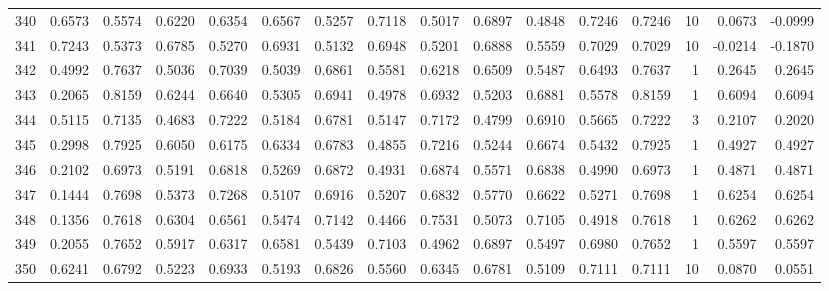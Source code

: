 \begin{tabular}{lrrrrrrrrrrrrrrr}
340 &      0.6573 &  0.5574 &  0.6220 &  0.6354 &  0.6567 &  0.5257 &  0.7118 &  0.5017 &  0.6897 &  0.4848 &   0.7246 &     0.7246 &     10 &                    0.0673 &                    -0.0999 \\
341 &      0.7243 &  0.5373 &  0.6785 &  0.5270 &  0.6931 &  0.5132 &  0.6948 &  0.5201 &  0.6888 &  0.5559 &   0.7029 &     0.7029 &     10 &                   -0.0214 &                    -0.1870 \\
342 &      0.4992 &  0.7637 &  0.5036 &  0.7039 &  0.5039 &  0.6861 &  0.5581 &  0.6218 &  0.6509 &  0.5487 &   0.6493 &     0.7637 &      1 &                    0.2645 &                     0.2645 \\
343 &      0.2065 &  0.8159 &  0.6244 &  0.6640 &  0.5305 &  0.6941 &  0.4978 &  0.6932 &  0.5203 &  0.6881 &   0.5578 &     0.8159 &      1 &                    0.6094 &                     0.6094 \\
344 &      0.5115 &  0.7135 &  0.4683 &  0.7222 &  0.5184 &  0.6781 &  0.5147 &  0.7172 &  0.4799 &  0.6910 &   0.5665 &     0.7222 &      3 &                    0.2107 &                     0.2020 \\
345 &      0.2998 &  0.7925 &  0.6050 &  0.6175 &  0.6334 &  0.6783 &  0.4855 &  0.7216 &  0.5244 &  0.6674 &   0.5432 &     0.7925 &      1 &                    0.4927 &                     0.4927 \\
346 &      0.2102 &  0.6973 &  0.5191 &  0.6818 &  0.5269 &  0.6872 &  0.4931 &  0.6874 &  0.5571 &  0.6838 &   0.4990 &     0.6973 &      1 &                    0.4871 &                     0.4871 \\
347 &      0.1444 &  0.7698 &  0.5373 &  0.7268 &  0.5107 &  0.6916 &  0.5207 &  0.6832 &  0.5770 &  0.6622 &   0.5271 &     0.7698 &      1 &                    0.6254 &                     0.6254 \\
348 &      0.1356 &  0.7618 &  0.6304 &  0.6561 &  0.5474 &  0.7142 &  0.4466 &  0.7531 &  0.5073 &  0.7105 &   0.4918 &     0.7618 &      1 &                    0.6262 &                     0.6262 \\
349 &      0.2055 &  0.7652 &  0.5917 &  0.6317 &  0.6581 &  0.5439 &  0.7103 &  0.4962 &  0.6897 &  0.5497 &   0.6980 &     0.7652 &      1 &                    0.5597 &                     0.5597 \\
350 &      0.6241 &  0.6792 &  0.5223 &  0.6933 &  0.5193 &  0.6826 &  0.5560 &  0.6345 &  0.6781 &  0.5109 &   0.7111 &     0.7111 &     10 &                    0.0870 &                     0.0551 \\

\end{tabular}
